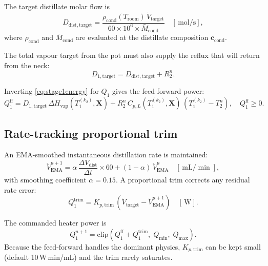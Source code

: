 \documentclass[11pt,letterpaper]{article}
\newcommand{\dt}{\Delta t}
\newcommand{\mol}{\,\text{mol}}
\newcommand{\W}{\,\text{W}}
\newcommand{\mL}{\,\text{mL}}
\begin{document}
The target distillate molar flow is
\begin{equation}
  D_{\mathrm{dist,target}}
  = \frac{\rho_{\mathrm{cond}}(T_{\mathrm{room}})\,\dot{V}_{\mathrm{target}}}
    {60 \times 10^6 \times \bar{M}_{\mathrm{cond}}} \quad [\mol/\text{s}],
  \label{eq:Dtarget}
\end{equation}
where $\rho_{\mathrm{cond}}$ and $\bar{M}_{\mathrm{cond}}$ are evaluated at
the distillate composition $\mathbf{c}_{\mathrm{cond}}$.

The total vapour target from the pot must also supply the reflux that will
return from the neck:
\begin{equation}
  D_{1,\mathrm{target}} = D_{\mathrm{dist,target}} + R_2^n.
  \label{eq:D1target}
\end{equation}

Inverting \cref{eq:stage1energy} for $Q_1$ gives the feed-forward power:
\begin{equation}
  Q_1^{\mathrm{ff}} = D_{1,\mathrm{target}}\,\Delta H_{\mathrm{vap}}(T_1^{(k_2)}, \mathbf{X})
    + R_2^n\,C_{p,L}(T_1^{(k_2)}, \mathbf{X})\,(T_1^{(k_2)} - T_2^n),
  \quad Q_1^{\mathrm{ff}} \ge 0.
  \label{eq:Q1ff}
\end{equation}

\subsection{Rate-tracking proportional trim}

An EMA-smoothed instantaneous distillation rate is maintained:
\begin{equation}
  \dot{V}_{\mathrm{EMA}}^{n+1}
  = \alpha\,\frac{\Delta V_{\mathrm{dist}}}{\dt}\times 60
    + (1 - \alpha)\,\dot{V}_{\mathrm{EMA}}^{n}
  \quad [\mL/\min],
\end{equation}
with smoothing coefficient $\alpha = 0.15$.  A proportional trim corrects
any residual rate error:
\begin{equation}
  Q_1^{\mathrm{trim}} = K_{p,\mathrm{trim}}\,(\dot{V}_{\mathrm{target}} - \dot{V}_{\mathrm{EMA}}^{n+1})
  \quad [\W].
\end{equation}

The commanded heater power is
\begin{equation}
  Q_1^{n+1} = \mathrm{clip}\!\left(Q_1^{\mathrm{ff}} + Q_1^{\mathrm{trim}},\;
    Q_{\min},\; Q_{\max}\right).
  \label{eq:Q1}
\end{equation}
Because the feed-forward handles the dominant physics, $K_{p,\mathrm{trim}}$
can be kept small (default 10\,W\,min/mL) and the trim rarely saturates.
\end{document}
